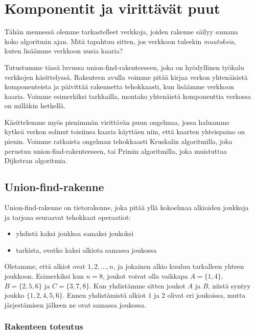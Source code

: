 \chapter{Komponentit ja virittävät puut}

Tähän mennessä olemme tarkastelleet verkkoja,
joiden rakenne säilyy samana koko algoritmin ajan.
Mitä tapahtuu sitten, jos verkkoon tuleekin \emph{muutoksia},
kuten lisäämme verkkoon uusia kaaria?

Tutustumme tässä luvussa union-find-rakenteeseen,
joka on hyödyl\-linen työkalu verkkojen käsittelyssä.
Rakenteen avulla voimme pitää kirjaa verkon yhtenäisistä
komponenteista ja päivittää rakennetta tehokkaasti,
kun lisäämme verkkoon kaaria.
Voimme esimerkiksi tarkkailla, montako yhte\-näistä
komponenttia verkossa on milläkin hetkellä.

Käsittelemme myös pienimmän virittävän puun ongelmaa,
jossa haluamme kytkeä verkon solmut toisiinsa kaaria käyttäen niin,
että kaarten yhteispaino on pienin.
Voimme ratkaista ongelman tehokkaasti Kruskalin algoritmilla,
joka perustuu union-find-rakenteeseen,
tai Primin algoritmilla, joka muistuttaa Dijkstran algoritmia.

\section{Union-find-rakenne}

Union-find-rakenne on tietorakenne, joka
pitää yllä kokoelmaa alkioiden joukkoja ja tarjoaa
seuraavat tehokkaat operaatiot:

\begin{itemize}
\item yhdistä kaksi joukkoa samaksi joukoksi
\item tarkista, ovatko kaksi alkiota samassa joukossa
\end{itemize}

Oletamme, että alkiot ovat $1,2,\dots,n$,
ja jokainen alkio kuuluu tarkalleen yhteen joukkoon.
Esimerkiksi kun $n=8$, joukot voivat olla vaikkapa
$A=\{1,4\}$, $B=\{2,5,6\}$ ja $C=\{3,7,8\}$.
Kun yhdistämme sitten joukot $A$ ja $B$,
niistä syntyy joukko $\{1,2,4,5,6\}$.
Ennen yhdistämistä alkiot $1$ ja $2$ olivat eri joukoissa,
mutta järjestämisen jälkeen ne ovat samassa joukossa.

\subsection{Rakenteen toteutus}

